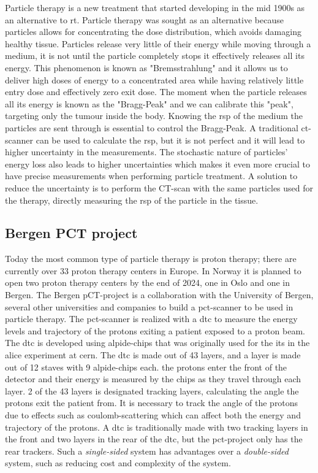 \documentclass[main.tex]{subfiles}
\begin{document}
Particle therapy is a new treatment that started developing in the mid 1900s as an alternative to \gls{rt}. Particle therapy was sought as an alternative because particles allows for  concentrating the dose distribution, which avoids damaging healthy tissue. Particles release very little of their energy while moving through a medium, it is not until the particle completely stops it effectively releases all its energy. This phenomenon is known as "Bremsstrahlung" and it allows us to deliver high doses of energy to a concentrated area while having relatively little entry dose and effectively zero exit dose. The moment when the particle releases all its energy is known as the "Bragg-Peak" and we can calibrate this "peak", targeting only the tumour inside the body. Knowing the \gls{rsp} of the medium the particles are sent through is essential to control the Bragg-Peak. A traditional \gls{ct}-scanner can be used to calculate the \gls{rsp}, but it is not perfect and it will lead to higher uncertainty in the measurements. The stochastic nature of particles' energy loss also leads to higher uncertainties which makes it even more crucial to have precise measurements when performing particle treatment. A solution to reduce the uncertainty is to perform the CT-scan with the same particles used for the therapy, directly measuring the \gls{rsp} of the particle in the tissue.



\subsection{Bergen PCT project}
Today the most common type of particle therapy is proton therapy; there are currently over 33 proton therapy centers in Europe. In Norway it is planned to open two proton therapy centers by the end of 2024, one in Oslo and one in Bergen. The Bergen pCT-project is a collaboration with the University of Bergen, several other universities and companies to build a \gls{pct}-scanner to be used in particle therapy. The \gls{pct}-scanner is realized with a \gls{dtc} to measure the energy levels and trajectory of the protons exiting a patient exposed to a proton beam. The \gls{dtc} is developed using \gls{alpide}-chips that was originally used for the \gls{its} in the \acrshort{alice} experiment at \acrshort{cern}. The \gls{dtc} is made out of 43 layers, and a layer is made out of 12 staves with 9 \gls{alpide}-chips each. the protons enter the front of the detector and their energy is measured by the chips as they travel through each layer. 2 of the 43 layers is designated tracking layers, calculating the angle the protons exit the patient from. It is necessary to track the angle of the protons due to effects such as coulomb-scattering which can affect both the energy and trajectory of the protons. A \gls{dtc} is traditionally made with two tracking layers in the front and two layers in the rear of the \gls{dtc}, but the \gls{pct}-project only has the rear trackers. Such a \textit{single-sided} system has advantages over a \textit{double-sided} system, such as reducing cost and complexity of the system. 
\end{document}
